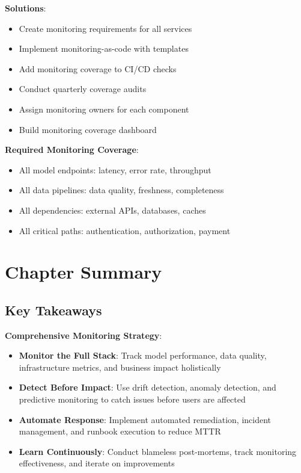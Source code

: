 \textbf{Solutions}:
\begin{itemize}
    \item Create monitoring requirements for all services
    \item Implement monitoring-as-code with templates
    \item Add monitoring coverage to CI/CD checks
    \item Conduct quarterly coverage audits
    \item Assign monitoring owners for each component
    \item Build monitoring coverage dashboard
\end{itemize}

\textbf{Required Monitoring Coverage}:
\begin{itemize}
    \item All model endpoints: latency, error rate, throughput
    \item All data pipelines: data quality, freshness, completeness
    \item All dependencies: external APIs, databases, caches
    \item All critical paths: authentication, authorization, payment
\end{itemize}

\section{Chapter Summary}

\subsection{Key Takeaways}

\textbf{Comprehensive Monitoring Strategy}:
\begin{itemize}
    \item \textbf{Monitor the Full Stack}: Track model performance, data quality, infrastructure metrics, and business impact holistically
    \item \textbf{Detect Before Impact}: Use drift detection, anomaly detection, and predictive monitoring to catch issues before users are affected
    \item \textbf{Automate Response}: Implement automated remediation, incident management, and runbook execution to reduce MTTR
    \item \textbf{Learn Continuously}: Conduct blameless post-mortems, track monitoring effectiveness, and iterate on improvements
\end{itemize}

